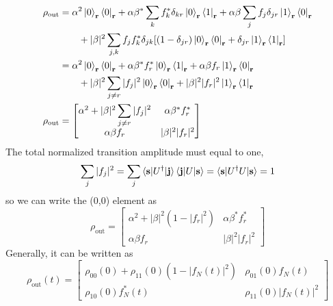 \documentclass[../../../main.tex]{subfiles}
\begin{document}
\begin{align*}
  \rho_\text{out}
   & = \alpha^2 \ket{0}_\mathbf{r } \bra{0}_\mathbf{r} + \alpha\beta^* \sum_k f_k^*  \delta_{kr}\ket{0}_\mathbf{r}\bra{1}_\mathbf{r} + \alpha \beta \sum_j f_j \delta_{jr}\ket{1}_\mathbf{r}\bra{0}_\mathbf{r} \\
   & \qquad + |\beta|^2 \sum_{j,k} f_j f_k^* \delta_{ {jk}} [(1-\delta_{ {jr}}) \ket{0}_\mathbf{r}\bra{0}_\mathbf{r}+\delta_{ {jr}} \ket{1}_\mathbf{r} \bra{1}_\mathbf{r}]                                     \\
   & = \alpha^2 \ket{0}_\mathbf{r } \bra{0}_\mathbf{r} + \alpha\beta^*  f_r^*\ket{0}_\mathbf{r}\bra{1}_\mathbf{r} + \alpha \beta f_r\ket{1}_\mathbf{r}\bra{0}_\mathbf{r}                                       \\
   & \qquad + |\beta|^2 \sum_{j \neq r} |f_j|^2 \ket{0}_\mathbf{r}\bra{0}_\mathbf{r} + |\beta|^2 |f_r|^2 \ket{1}_\mathbf{r} \bra{1}_\mathbf{r}                                                                 \\
  \rho_\text{out}
   & = \begin{bmatrix}
         \alpha^2 + |\beta|^2 \displaystyle\sum_{j \neq r} |f_j|^2 & \alpha\beta^*  f_r^* \\
         \alpha\beta  f_r                                          & |\beta|^2 |f_r|^2
       \end{bmatrix}
\end{align*}
The total normalized transition amplitude must equal to one,
\begin{equation*}
  \sum_j |f_j|^2 = \sum_j \braket{\mathbf{s}|U^\dagger|\mathbf{j} } \braket{\mathbf{j}|U|\mathbf{s}} = \braket{\mathbf{s}|U^\dagger U|\mathbf{s} } =1
\end{equation*}
so we can write the (0,0) element as
\begin{equation*}
  \rho_\text{out}
  = \begin{bmatrix}
    \alpha^2 + |\beta|^2 (1-|f_r|^2) & \alpha\beta^*  f_r^* \\
    \alpha\beta  f_r                 & |\beta|^2 |f_r|^2
  \end{bmatrix}
\end{equation*}
Generally, it can be written as
\begin{equation*}
  \rho_\text{out}(t) =
  \begin{bmatrix}
    \rho_{00}(0) + \rho_{11}(0)(1-|f_N(t)|^2) & \rho_{01}(0)f_N(t)     \\
    \rho_{10}(0) f_N ^*(t)                    & \rho_{11}(0)|f_N(t)|^2
  \end{bmatrix}
\end{equation*}
\end{document}
